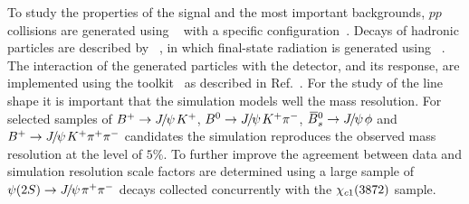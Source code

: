 To study the properties of the signal and the most important backgrounds, $pp$ collisions are generated using 
\pythia~\cite{Sjostrand:2006za,*Sjostrand:2007gs}  with a specific
\lhcb configuration~\cite{LHCb-PROC-2010-056}.  Decays of hadronic
particles are described by \evtgen~\cite{Lange:2001uf}, in which
final-state radiation is generated using
\photos~\cite{Golonka:2005pn}. The 
interaction of the generated particles with the detector, and its
response, are implemented using the \geant
toolkit~\cite{Allison:2006ve, *Agostinelli:2002hh} as described in
Ref.~\cite{LHCb-PROC-2011-006}. For the study of the line shape it is
important that the simulation models well the mass resolution. For selected samples of ${{B}^+} \rightarrow
{\ensuremath{{J\mskip -3mu/\mskip -2mu\psi\mskip 2mu}}} K^+$, ${{B}^0} \rightarrow {\ensuremath{{J\mskip -3mu/\mskip -2mu\psi\mskip 2mu}}} {\ensuremath{{K}^+}} {\ensuremath{{\pi}^-}}$, ${{\kern 0.18em\overline{\kern -0.18em B}{}}{}^0_{s}} \rightarrow
{\ensuremath{{J\mskip -3mu/\mskip -2mu\psi\mskip 2mu}}} \phi$ and ${{B}^+} \rightarrow {\ensuremath{{J\mskip -3mu/\mskip -2mu\psi\mskip 2mu}}}  {\ensuremath{{K}^+}} {\ensuremath{{\pi}^+}} {\ensuremath{{\pi}^-}}$ candidates
the simulation reproduces the observed mass resolution at the
level of $5 \%$. To further improve the agreement between data and simulation
resolution scale factors are determined using a large sample of
${\psi{(2S)}} \rightarrow {\ensuremath{{J\mskip -3mu/\mskip -2mu\psi\mskip 2mu}}}
{\ensuremath{{\pi}^+}} {\ensuremath{{\pi}^-}} $ decays collected concurrently with the
${\chi_{{c} 1}}(3872)$ sample.

